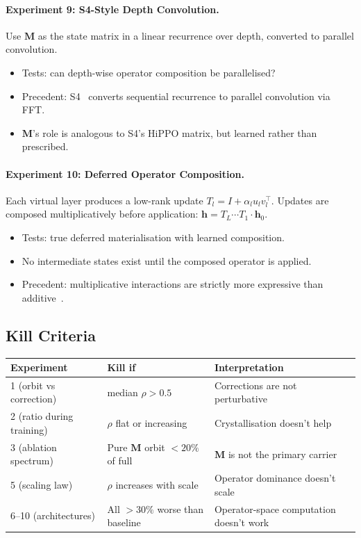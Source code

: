 \documentclass[11pt, a4paper]{article}
\newcommand{\M}{\mathbf{M}}
\newcommand{\h}{\mathbf{h}}
\theoremstyle{plain}
\theoremstyle{definition}
\theoremstyle{remark}
\begin{document}
\paragraph{Experiment 9: S4-Style Depth Convolution.}
Use $\M$ as the state matrix in a linear recurrence over depth, converted to parallel convolution.
\begin{itemize}[nosep]
\item Tests: can depth-wise operator composition be parallelised?
\item Precedent: S4~\cite{gu2022s4} converts sequential recurrence to parallel convolution via FFT.
\item $\M$'s role is analogous to S4's HiPPO matrix, but learned rather than prescribed.
\end{itemize}

\paragraph{Experiment 10: Deferred Operator Composition.}
Each virtual layer produces a low-rank update $T_l = I + \alpha_l u_l v_l^\top$.
Updates are composed multiplicatively before application: $\h = T_L \cdots T_1 \cdot \h_0$.
\begin{itemize}[nosep]
\item Tests: true deferred materialisation with learned composition.
\item No intermediate states exist until the composed operator is applied.
\item Precedent: multiplicative interactions are strictly more expressive than additive~\cite{jayakumar2020multiplicative}.
\end{itemize}


\subsection{Kill Criteria}

\begin{center}\small
\begin{tabular}{lll}
\toprule
\textbf{Experiment} & \textbf{Kill if} & \textbf{Interpretation} \\
\midrule
1 (orbit vs correction) & median $\rho > 0.5$ & Corrections are not perturbative \\
2 (ratio during training) & $\rho$ flat or increasing & Crystallisation doesn't help \\
3 (ablation spectrum) & Pure $\M$ orbit $< 20\%$ of full & $\M$ is not the primary carrier \\
5 (scaling law) & $\rho$ increases with scale & Operator dominance doesn't scale \\
6--10 (architectures) & All $> 30\%$ worse than baseline & Operator-space computation doesn't work \\
\bottomrule
\end{tabular}
\end{center}
\end{document}

